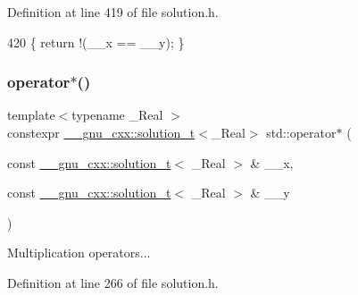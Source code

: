 Definition at line 419 of file solution.\+h.


\begin{DoxyCode}
420     \{ \textcolor{keywordflow}{return} !(\_\_x == \_\_y); \}
\end{DoxyCode}
\mbox{\label{namespacestd_afe761665ed44abc2edacac26cb45c645}} 
\subsubsection{\texorpdfstring{operator$\ast$()}{operator*()}\hspace{0.1cm}{\footnotesize\ttfamily [1/5]}}
{\footnotesize\ttfamily template$<$typename \+\_\+\+Real $>$ \\
constexpr \hyperlink{namespace____gnu__cxx_ae20ea642de50eb361074c62676b0159c}{\+\_\+\+\_\+gnu\+\_\+cxx\+::solution\+\_\+t}$<$\+\_\+\+Real$>$ std\+::operator$\ast$ (\begin{DoxyParamCaption}\item[{const \hyperlink{namespace____gnu__cxx_ae20ea642de50eb361074c62676b0159c}{\+\_\+\+\_\+gnu\+\_\+cxx\+::solution\+\_\+t}$<$ \+\_\+\+Real $>$ \&}]{\+\_\+\+\_\+x,  }\item[{const \hyperlink{namespace____gnu__cxx_ae20ea642de50eb361074c62676b0159c}{\+\_\+\+\_\+gnu\+\_\+cxx\+::solution\+\_\+t}$<$ \+\_\+\+Real $>$ \&}]{\+\_\+\+\_\+y }\end{DoxyParamCaption})}

Multiplication operators... 

Definition at line 266 of file solution.\+h.


